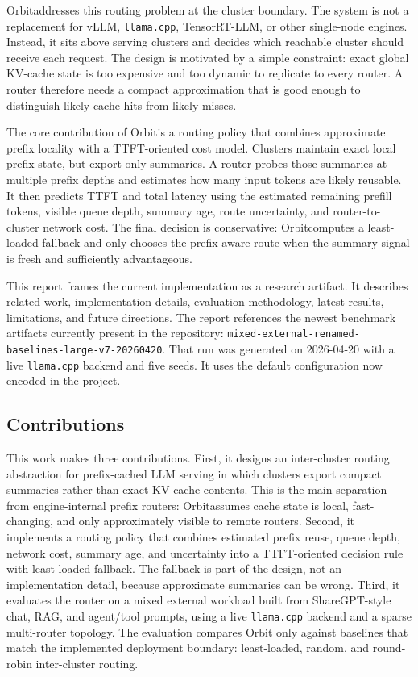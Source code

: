 \documentclass[10pt,twocolumn]{article}
\newcommand{\sys}{Orbit}
\newcommand{\runpath}{\texttt{mixed-\allowbreak{}external-\allowbreak{}renamed-\allowbreak{}baselines-\allowbreak{}large-v7-\allowbreak{}20260420}}
\begin{document}
\sys addresses this routing problem at the cluster boundary. The system is not a replacement for vLLM, \texttt{llama.cpp}, TensorRT-LLM, or other single-node engines. Instead, it sits above serving clusters and decides which reachable cluster should receive each request. The design is motivated by a simple constraint: exact global KV-cache state is too expensive and too dynamic to replicate to every router. A router therefore needs a compact approximation that is good enough to distinguish likely cache hits from likely misses.

The core contribution of \sys is a routing policy that combines approximate prefix locality with a TTFT-oriented cost model. Clusters maintain exact local prefix state, but export only summaries. A router probes those summaries at multiple prefix depths and estimates how many input tokens are likely reusable. It then predicts TTFT and total latency using the estimated remaining prefill tokens, visible queue depth, summary age, route uncertainty, and router-to-cluster network cost. The final decision is conservative: \sys computes a least-loaded fallback and only chooses the prefix-aware route when the summary signal is fresh and sufficiently advantageous.

This report frames the current implementation as a research artifact. It describes related work, implementation details, evaluation methodology, latest results, limitations, and future directions. The report references the newest benchmark artifacts currently present in the repository: \runpath. That run was generated on 2026-04-20 with a live \texttt{llama.cpp} backend and five seeds. It uses the default configuration now encoded in the project.

\subsection{Contributions}

This work makes three contributions. First, it designs an inter-cluster routing abstraction for prefix-cached LLM serving in which clusters export compact summaries rather than exact KV-cache contents. This is the main separation from engine-internal prefix routers: \sys assumes cache state is local, fast-changing, and only approximately visible to remote routers. Second, it implements a routing policy that combines estimated prefix reuse, queue depth, network cost, summary age, and uncertainty into a TTFT-oriented decision rule with least-loaded fallback. The fallback is part of the design, not an implementation detail, because approximate summaries can be wrong. Third, it evaluates the router on a mixed external workload built from ShareGPT-style chat, RAG, and agent/tool prompts, using a live \texttt{llama.cpp} backend and a sparse multi-router topology. The evaluation compares Orbit only against baselines that match the implemented deployment boundary: least-loaded, random, and round-robin inter-cluster routing.
\end{document}
